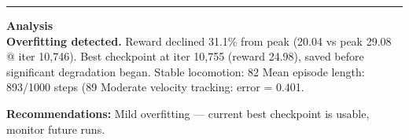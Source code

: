 \documentclass[a4paper,10pt]{article}
\begin{document}
\vspace{2pt}
\hrule
\vspace{2pt}

\footnotesize
\textbf{Analysis} \\[1pt]
\textbf{Overfitting detected.} Reward declined 31.1\% from peak (20.04 vs peak 29.08 @ iter 10,746).
Best checkpoint at iter 10,755 (reward 24.98), saved before significant degradation began.
Stable locomotion: 82%
Mean episode length: 893/1000 steps (89%
Moderate velocity tracking: error = 0.401.

\textbf{Recommendations:}
Mild overfitting --- current best checkpoint is usable, monitor future runs.
\end{document}
